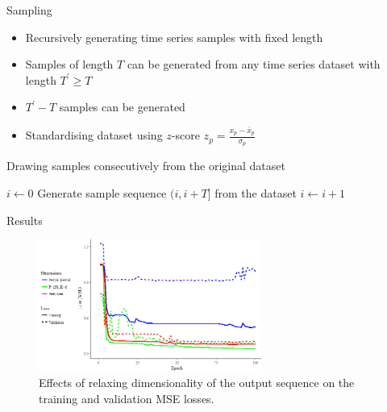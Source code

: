 \documentclass{beamer}
\begin{document}
\begin{frame}[shrink]{Sampling}
  \begin{itemize}
    \item Recursively generating time series samples with fixed length
    \item Samples of length \(T\) can be generated from any time series dataset with length \(T^{'} \geq T \)
    \item \(T^{'}-T\) samples can be generated
    \item Standardising dataset using \(z\)-score \( z_p=\frac{x_p-\bar{x}_p}{\sigma_p} \)
  \end{itemize}
  
  \begin{algorithm}[H]
  	\label{consecutive_sampling}
  	\caption{Drawing samples consecutively from the original dataset}
  	\(i\leftarrow 0\) \;
  	 {
  		Generate sample sequence \((i, i+T]\) from the dataset\;
  		\(i\leftarrow i+1\)\;
  	}
  \end{algorithm}
\end{frame}

\begin{frame}{Results}
  \begin{figure}[h]
  	\centering
  	\includegraphics[width=0.65\textwidth]{output_dims.png}
  	\caption{Effects of relaxing dimensionality of the output sequence on the training and validation MSE losses.}
  \end{figure}
\end{frame}
\end{document}

